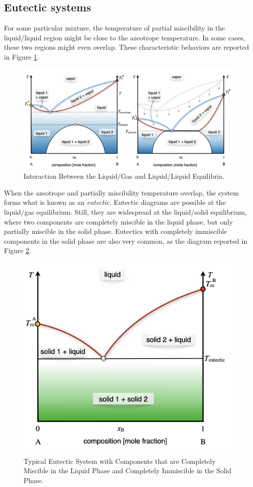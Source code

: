 \documentclass[
  9pt,
]{extbook}
\theoremstyle{definition}
\theoremstyle{definition}
\theoremstyle{definition}
\theoremstyle{remark}
\begin{document}
\hypertarget{eutectic-systems}{%
\subsection{Eutectic systems}\label{eutectic-systems}}

For some particular mixture, the temperature of partial miscibility in the liquid/liquid region might be close to the azeotrope temperature. In some cases, these two regions might even overlap. These characteristic behaviors are reported in Figure \ref{fig:FigMC13}.

\begin{figure}

{\centering \includegraphics[width=0.8\linewidth]{./img/OEP_Figures.031} 

}

\caption{Interaction Between the Liquid/Gas and Liquid/Liquid Equilibria.}\label{fig:FigMC13}
\end{figure}

When the azeotrope and partially miscibility temperature overlap, the system forms what is known as an \emph{eutectic}. Eutectic diagrams are possible at the liquid/gas equilibrium. Still, they are widespread at the liquid/solid equilibrium, where two components are completely miscible in the liquid phase, but only partially miscible in the solid phase. Eutectics with completely immiscible components in the solid phase are also very common, as the diagram reported in Figure \ref{fig:FigMC14}.

\begin{figure}

{\centering \includegraphics[width=0.6\linewidth]{./img/OEP_Figures.032} 

}

\caption{Typical Eutectic System with Components that are Completely Miscible in the Liquid Phase and Completely Immiscible in the Solid Phase.}\label{fig:FigMC14}
\end{figure}
\end{document}
